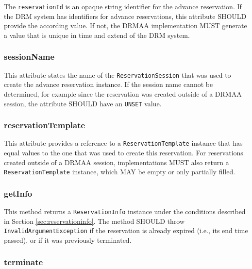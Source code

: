 \documentclass{article}
\newcommand{\h}[1]{\lstinline|#1|}
\newcommand{\rat}[1]{}
\begin{document}
The \h{reservationId} is an opaque string identifier for the advance reservation. If the DRM system has identifiers for advance reservations, this attribute SHOULD provide the according value. If not, the DRMAA implementation MUST generate a value that is unique in time and extend of the DRM system.

\subsubsection{sessionName}

This attribute states the name of the \h{ReservationSession} that was used to create the advance reservation instance. If the session name cannot be determined, for example since the reservation was created outside of a DRMAA session, the attribute SHOULD have an \h{UNSET} value.

\rat{June 29th 2011 conf call decided to return session names instead of session objects. This keeps the consistent approach that instantiated session objects represent a live ``connection'' to the DRMS. Connecting to the referenced session is then a separate explicit step in the application. It also supports better that people create instances from reservation created outside of a DRMAA session.
}

\subsubsection{reservationTemplate}

This attribute provides a reference to a \h{ReservationTemplate} instance that has equal values to the one that was used to create this reservation. For reservations created outside of a DRMAA session, implementations MUST also return a \h{ReservationTemplate} instance, which MAY be empty or only partially filled.

\subsubsection{getInfo}
This method returns a \h{ReservationInfo} instance under the conditions described in Section \ref{sec:reservationinfo}. The method SHOULD throw \h{InvalidArgumentException} if the reservation is already expired (i.e., its end time passed), or if it was previously terminated. 

\subsubsection{terminate}
\end{document}
